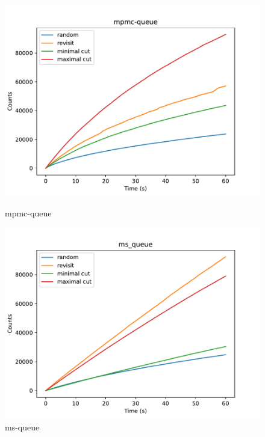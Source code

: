 \begin{figure}[h!]
	\begin{minipage}{0.45\textwidth}
		\centering
		\includegraphics[width=\textwidth]{figure/genmc-time/mpmc-queue.pdf}
		\caption{mpmc-queue}
		\label{genmc:mpmc-queue-time}
	\end{minipage}
	\hfill
	\begin{minipage}{0.45\textwidth}
		\centering
		\includegraphics[width=\textwidth]{figure/genmc-time/ms_queue.pdf}
		\caption{ms-queue}
		\label{genmc:ms-queue-time}
	\end{minipage}

	\vspace{0.5cm}


\end{figure}
